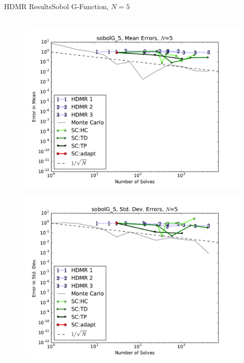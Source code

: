 \documentclass{beamer}
\begin{document}
\begin{frame}{HDMR Results}{Sobol G-Function, $N=5$}
\begin{columns}
\begin{column}{0.5\textwidth}
\begin{figure}[h!]
          \includegraphics[width=0.8\linewidth]{anlmodels/sobolG_5_mean_errs}
        \end{figure}
        \vspace{-20pt}
        \begin{figure}[h!]
          \centering
          \includegraphics[width=0.8\linewidth]{anlmodels/sobolG_5_variance_errs}
        \end{figure}
   \end{column}
 \end{columns}
\end{frame}
\end{document}
